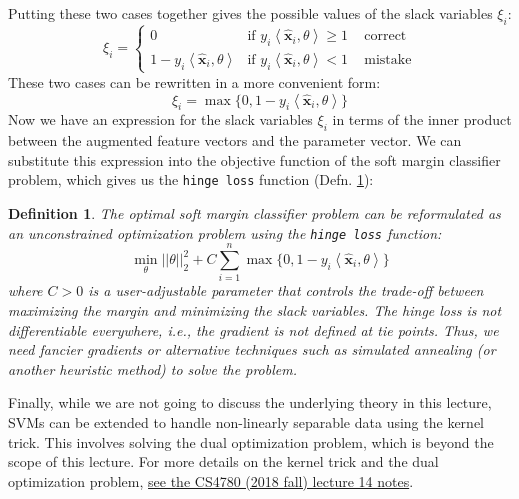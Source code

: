 \documentclass{article}[11pt]
\newtheorem{defn}{Definition}
\newcommand{\norm}[1]{\left|\left|#1\right|\right|}
\begin{document}
Putting these two cases together gives the possible values of the slack variables $\xi_{i}$:
\begin{equation*}
    \xi_{i} = \begin{cases}
        0 & \text{if $y_{i}\left<\hat{\mathbf{x}}_{i},\theta\right> \geq 1$}\,\quad\text{correct}\\
        1 - y_{i}\left<\hat{\mathbf{x}}_{i},\theta\right> & \text{if $y_{i}\left<\hat{\mathbf{x}}_{i},\theta\right> < 1$}\,\quad\text{mistake}
    \end{cases}
\end{equation*}
These two cases can be rewritten in a more convenient form:
\begin{equation*}
    \xi_{i} = \max\{0, 1 - y_{i}\left<\hat{\mathbf{x}}_{i},\theta\right>\}
\end{equation*}
Now we have an expression for the slack variables $\xi_{i}$ in terms of the inner product between the augmented feature vectors and the parameter vector.
We can substitute this expression into the objective function of the soft margin classifier problem, which gives us the \texttt{hinge loss} function (Defn. \ref{defn:hinge-loss}):
\begin{mdframed}
\begin{defn}\label{defn:hinge-loss}
The optimal soft margin classifier problem can be reformulated as an unconstrained optimization problem using the \texttt{hinge loss} function:
\begin{equation*}
    \min_{\theta}\norm{\theta}_{2}^{2} + C\sum_{i=1}^{n}\max\{0, 1 - y_{i}\left<\hat{\mathbf{x}}_{i},\theta\right>\}
\end{equation*}
where $C>{0}$ is a user-adjustable parameter that controls the trade-off between maximizing the margin and minimizing the slack variables.
The hinge loss is not differentiable everywhere, i.e., the gradient is not defined at tie points. 
Thus, we need fancier gradients or alternative techniques such as simulated annealing (or another heuristic method) to solve the problem. 
\end{defn}
\end{mdframed}

Finally, while we are not going to discuss the underlying theory in this lecture, SVMs can be extended to handle non-linearly separable data using the kernel trick.
This involves solving the dual optimization problem, which is beyond the scope of this lecture.
For more details on the kernel trick and the dual optimization problem, \href{https://www.cs.cornell.edu/courses/cs4780/2018fa/lectures/lecturenote14.html}{see the CS4780 (2018 fall) lecture 14 notes}.
\end{document}

